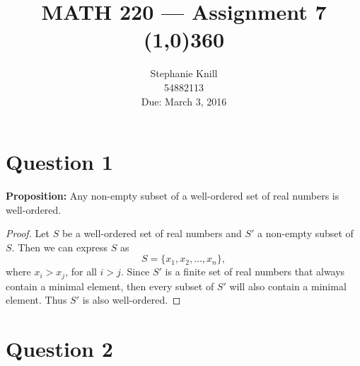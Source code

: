 \documentclass[11pt, oneside]{article}   	%
\begin{document}
\title{MATH 220 --- Assignment 7 \\
\line(1,0){360} \\              %
}
\author{
Stephanie Knill \\
54882113 \\
Due: March 3, 2016}

\date{}                   %
\maketitle




\section*{Question 1}

\textbf{Proposition:} Any non-empty subset of a well-ordered set of real numbers is well-ordered.

\begin{proof}
Let $S$ be a well-ordered set of real numbers and $S'$ a non-empty subset of $S$. Then we can express $S$ as
$$S=\{x_1, x_2, \ldots, x_n\},$$
where $x_i > x_j$, for all $i>j$.
Since $S'$ is a finite set of real numbers that always contain a minimal element, then every subset of $S'$ will also contain a minimal element. Thus $S'$ is also well-ordered.
\end{proof}

\section*{Question 2}
\end{document}
